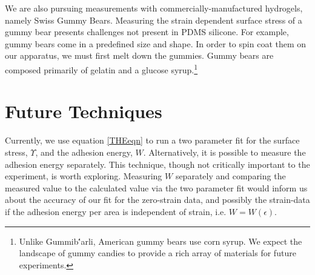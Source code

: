 We are also pursuing measurements with commercially-manufactured hydrogels, namely Swiss Gummy Bears. Measuring the strain dependent surface stress of a gummy bear presents challenges not present in PDMS silicone. For example, gummy bears come in a predefined size and shape. In order to spin coat them on our apparatus, we must first melt down the gummies. Gummy bears are composed primarily of gelatin and a glucose syrup.\footnote{Unlike Gummib{\''a}rli, American gummy bears use corn syrup. We expect the landscape of gummy candies to provide a rich array of materials for future experiments.}
  
\section{Future Techniques}
Currently, we use equation \ref{THEeqn} to run a two parameter fit for the surface stress, $ \Upsilon $, and the adhesion energy, $ W $. Alternatively, it is possible to measure the adhesion energy separately. This technique, though not critically important to the experiment, is worth exploring. Measuring $ W $ separately and comparing the measured value to the calculated value via the two parameter fit would inform us about the accuracy of our fit for the zero-strain data, and possibly the strain-data if the adhesion energy per area is independent of strain, i.e. $ W = W(\epsilon) $.   

